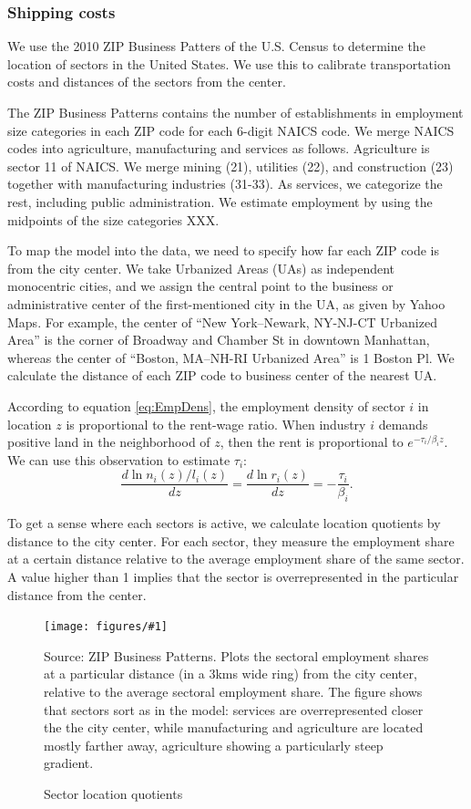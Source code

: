 \documentclass[12pt]{article}
\newcommand{\dofigure}[3]{\begin{figure}
\begin{centering}
\texttt{[image: figures/\#1]}
  \caption{#2\label{fig:#1}}
\end{centering}

\noindent \footnotesize{#3}
\end{figure}}
\begin{document}
\subsubsection{Shipping costs}

We use the 2010 ZIP Business Patters of the U.S. Census to determine the location of sectors in the United States. We use this to calibrate transportation costs and distances of the sectors from the center.

The ZIP Business Patterns contains the number of establishments in employment size categories in each ZIP code for each 6-digit NAICS code. We merge NAICS codes into agriculture, manufacturing and services as follows. Agriculture is sector 11 of NAICS. We merge mining (21), utilities (22), and construction (23) together with manufacturing industries (31-33). As services, we categorize the rest, including public administration. We estimate employment by using the midpoints of the size categories XXX.

To map the model into the data, we need to specify how far each ZIP code is from the city center. We take Urbanized Areas (UAs) as independent monocentric cities, and we assign the central point to the business or administrative center of the first-mentioned city in the UA, as given by Yahoo Maps. For example, the center of ``New York–Newark, NY-NJ-CT Urbanized Area'' is the corner of Broadway and Chamber St in downtown Manhattan, whereas the center of ``Boston, MA–NH-RI Urbanized Area'' is 1 Boston Pl. We calculate the distance of each ZIP code to business center of the nearest UA. 

According to equation \ref{eq:EmpDens}, the employment density of sector $i$ in location $z$ is proportional to the rent-wage ratio. When industry $i$ demands positive land in the neighborhood of $z$, then the rent is proportional to $e^{-\tau_i/\beta_i z}$. We can use this observation to estimate $\tau_i$:
\[
\frac{d\ln n_i(z)/l_i(z)}{dz} =\frac{d\ln r_i(z)}{dz} = -\frac{\tau_i}{\beta_i}.
\]

To get a sense where each sectors is active, we calculate location quotients by distance to the city center. For each sector, they measure the employment share at a certain distance relative to the average employment share of the same sector. A value higher than 1 implies that the sector is overrepresented in the particular distance from the center.

\dofigure{sector_location_quotients}{Sector location quotients}{Source: ZIP Business Patterns. Plots the sectoral employment shares at a particular distance (in a 3kms wide ring) from the city center, relative to the average sectoral employment share. The figure shows that sectors sort as in the model: services are overrepresented closer the the city center, while manufacturing and agriculture are located mostly farther away, agriculture showing a particularly steep gradient.}
\end{document}
